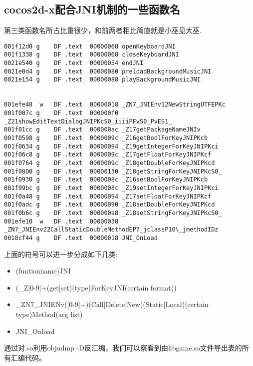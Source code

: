 \subsection{cocos2d-x配合JNI机制的一些函数名}
\label{sec:so:sysjnilib}
第三类函数名所占比重很少，和前两者相比简直就是小巫见大巫.\\
\begin{lstlisting}
001f12d0 g    DF .text  00000068 openKeyboardJNI
001f1338 g    DF .text  00000068 closeKeyboardJNI
0021e540 g    DF .text  00000054 endJNI
0021e0d4 g    DF .text  00000080 preloadBackgroundMusicJNI
0021e154 g    DF .text  00000088 playBackgroundMusicJNI


001efe48  w   DF .text  00000018 _ZN7_JNIEnv12NewStringUTFEPKc
001f007c g    DF .text  000000f0 _Z21showEditTextDialogJNIPKcS0_iiiiPFvS0_PvES1_
001f01cc g    DF .text  000000ac _Z17getPackageNameJNIv
001f0598 g    DF .text  0000009c _Z16getBoolForKeyJNIPKcb
001f0634 g    DF .text  00000094 _Z19getIntegerForKeyJNIPKci
001f06c8 g    DF .text  0000009c _Z17getFloatForKeyJNIPKcf
001f0764 g    DF .text  0000009c _Z18getDoubleForKeyJNIPKcd
001f0800 g    DF .text  00000130 _Z18getStringForKeyJNIPKcS0_
001f0930 g    DF .text  0000008c _Z16setBoolForKeyJNIPKcb
001f09bc g    DF .text  0000008c _Z19setIntegerForKeyJNIPKci
001f0a48 g    DF .text  00000094 _Z17setFloatForKeyJNIPKcf
001f0adc g    DF .text  00000090 _Z18setDoubleForKeyJNIPKcd
001f0b6c g    DF .text  000000a8 _Z18setStringForKeyJNIPKcS0_
001efe10  w   DF .text  00000038 _ZN7_JNIEnv22CallStaticDoubleMethodEP7_jclassP10\_jmethodIDz
0018cf44 g    DF .text  00000018 JNI_OnLoad
\end{lstlisting}

上面的符号可以进一步分成如下几类:
\begin{itemize}
\item (funtionname)JNI
\item (\_Z[0-9]+(get|set)(type)ForKeyJNI(certain format))
\item \_ZN7\_JNIENv([0-9]+)(Call|Delete|New)(Static|Local)(certain type)Method(arg list)
\item JNI\_Onload
\end{itemize}

通过对.so利用objudmp -D反汇编，我们可以察看到由libgame.so文件导出表的所有汇编代码。

